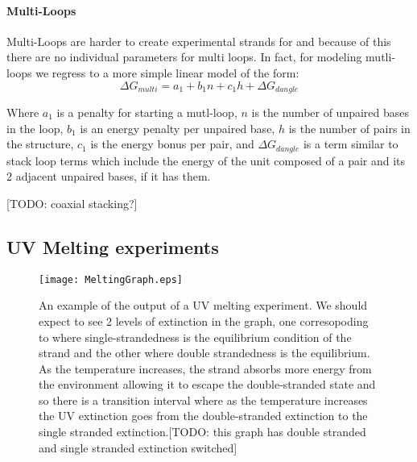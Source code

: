 \paragraph{Multi-Loops}
Multi-Loops are harder to create experimental strands for and because
of this there are no individual parameters for multi loops. In fact,
for modeling mutli-loops we regress to a more simple linear model of the form:
\begin{equation}
\Delta G_{multi} = a_1 + b_1 n + c_1 h + \Delta G_{dangle}
\end{equation}

Where $a_1$ is a penalty for starting a mutl-loop, $n$ is the number
of unpaired bases in the loop, $b_1$ is an energy penalty per unpaired
base, $h$ is the number of pairs in the structure, $c_1$ is the energy
bonus per pair, and $\Delta G_{dangle}$ is a term similar to stack
loop terms which include the energy of the unit composed of a pair and
its 2 adjacent unpaired bases, if it has them.

[TODO: coaxial stacking?]

\subsection{UV Melting experiments}

\begin{figure}[h]
\centering
\texttt{[image: MeltingGraph.eps]}

\caption{An example of the output of a UV melting experiment. We
  should expect to see 2 levels of extinction in the graph, one
  corresopoding to where single-strandedness is the equilibrium
  condition of the strand and the other where double strandedness is
  the equilibrium. As the temperature increases, the strand absorbs
  more energy from the environment allowing it to escape the
  double-stranded state and so there is a transition interval where as
  the temperature increases the UV extinction goes from the
  double-stranded extinction to the single stranded extinction.[TODO:
    this graph has double stranded and single stranded extinction
    switched]}
\label{fig:UVMeltGraph}
\end{figure}

